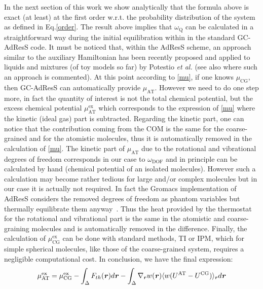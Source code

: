 \documentclass[a4paper,preprint,unsortedaddress]{revtex4-1}
\newcommand{\vect}[1]{\textbf{\textit{#1}}}
\newcommand{\dof}{{\textrm{DOF}}}
\newcommand{\AT}{{\textrm{{AT}}}}
\newcommand{\CG}{{\textrm{CG}}}
\newcommand{\exc}{{\textrm{ex}}}
\newcommand{\thermo}{{\textrm{Q}}}
\begin{document}
{In the next section of this work we show analytically that the formula above is exact (at least) at the first order w.r.t. the probability distribution of the system as defined in Eq.\ref{order}}.
The result above implies that $\omega_{\thermo}$ can be calculated in a straightforward way during the initial equilibration within in the standard GC-AdResS code. 
{It must be noticed that, within the AdResS scheme, an approach similar to the auxiliary Hamiltonian  has been recently proposed and applied to liquids and mixtures (of toy models so far) by Potestio {\it et al.} \cite{h-adress-0, h-adress} (see also \cite{luigientropy} where such an approach is commented)}. At this point according to \eqref{mu}, if one knows $\mu_{\CG}$, then  GC-AdResS can automatically provide $\mu_{\AT}$. However we need to do one step more, in fact the quantity of interest is not the total chemical potential, but the excess chemical potential $\mu^{\exc}_{\AT}$ which corresponds to the expression of \eqref{mu} where the kinetic (ideal gas) part is subtracted. Regarding the kinetic part, one can notice that the contribution coming from the COM is the same for the coarse-grained and for the atomistic molecules, thus it is automatically removed in the calculation of \eqref{mu}.
The kinetic part of $\mu_{\AT}$ due to the rotational and vibrational degrees of freedom corresponds in our case to $\omega_{\dof}$ and {in principle can be calculated by hand (chemical potential of an isolated molecules). However such a calculation may become rather tedious for large and/or complex molecules but in our case it is actually not required.} In fact the {Gromacs implementation of AdResS} considers the removed degrees of freedom as phantom variables but thermally equilibrate them anyway~\cite{simon-ch}. Thus the heat provided by the thermostat for the rotational and vibrational part is the same in the atomistic and coarse-graining molecules and is automatically removed in the difference. Finally, the calculation of $\mu^{\exc}_{\CG}$ can be done with standard methods, TI or IPM, which for simple spherical molecules, like those of the coarse-grained system, requires a negligible computational cost.
In conclusion, we have the final expression:
\begin{equation}
  \mu^{\exc}_{\AT}=
  \mu^{\exc}_{\CG}-
  \int_{\Delta}{F}_{th}({\vect r})d{\vect r}-
  \int_{\Delta}\nabla_{\vect r} w(\vect r) \langle w(U^{\AT}-U^{\CG})\rangle_{\vect r} d{\vect r}
\label{finalmu}
\end{equation}
\end{document}
